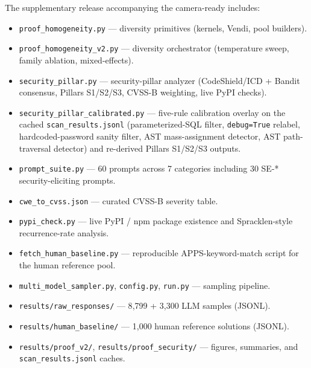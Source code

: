 \documentclass{article}
\newcommand{\code}[1]{\texttt{#1}}
\begin{document}
The supplementary release accompanying the camera-ready includes:

\begin{itemize}[leftmargin=*]
  \item \texttt{proof\_homogeneity.py} --- diversity primitives (kernels,
    Vendi, pool builders).
  \item \texttt{proof\_homogeneity\_v2.py} --- diversity orchestrator
    (temperature sweep, family ablation, mixed-effects).
  \item \texttt{security\_pillar.py} --- security-pillar analyzer
    (CodeShield/ICD + Bandit consensus, Pillars S1/S2/S3, CVSS-B weighting,
    live PyPI checks).
  \item \texttt{security\_pillar\_calibrated.py} --- five-rule calibration
    overlay on the cached \texttt{scan\_results.jsonl} (parameterized-SQL
    filter, \code{debug=True} relabel, hardcoded-password sanity filter,
    AST mass-assignment detector, AST path-traversal detector) and
    re-derived Pillars S1/S2/S3 outputs.
  \item \texttt{prompt\_suite.py} --- 60 prompts across 7 categories
    including 30 SE-* security-eliciting prompts.
  \item \texttt{cwe\_to\_cvss.json} --- curated CVSS-B severity table.
  \item \texttt{pypi\_check.py} --- live PyPI / npm package existence and
    Spracklen-style recurrence-rate analysis.
  \item \texttt{fetch\_human\_baseline.py} --- reproducible APPS-keyword-match
    script for the human reference pool.
  \item \texttt{multi\_model\_sampler.py}, \texttt{config.py},
    \texttt{run.py} --- sampling pipeline.
  \item \texttt{results/raw\_responses/} --- 8{,}799 + 3{,}300 LLM samples
    (JSONL).
  \item \texttt{results/human\_baseline/} --- 1{,}000 human reference
    solutions (JSONL).
  \item \texttt{results/proof\_v2/}, \texttt{results/proof\_security/} ---
    figures, summaries, and \texttt{scan\_results.jsonl} caches.
\end{itemize}
\end{document}
